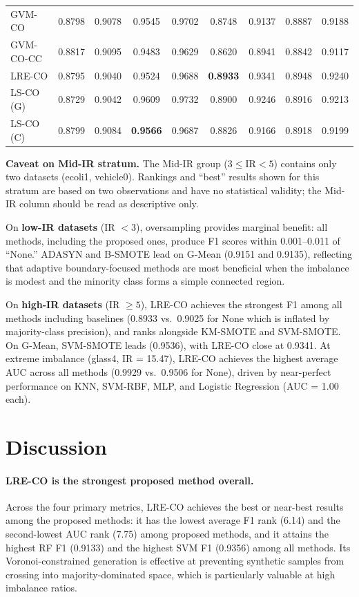 \begin{table}[H]
{\begin{tabular}{lcc|cc|cc|cc}
\midrule
GVM-CO     & 0.8798 & 0.9078 & 0.9545 & 0.9702 & 0.8748 & 0.9137 & 0.8887 & 0.9188 \\
GVM-CO-CC  & 0.8817 & 0.9095 & 0.9483 & 0.9629 & 0.8620 & 0.8941 & 0.8842 & 0.9117 \\
LRE-CO     & 0.8795 & 0.9040 & 0.9524 & 0.9688 & \textbf{0.8933} & 0.9341 & 0.8948 & 0.9240 \\
LS-CO (G)  & 0.8729 & 0.9042 & 0.9609 & 0.9732 & 0.8900 & 0.9246 & 0.8916 & 0.9213 \\
LS-CO (C)  & 0.8799 & 0.9084 & \textbf{0.9566} & 0.9687 & 0.8826 & 0.9166 & 0.8918 & 0.9199 \\
\bottomrule
\end{tabular}
}
\end{table}

\noindent\textbf{Caveat on Mid-IR stratum.}
The Mid-IR group ($3 \leq \text{IR} < 5$) contains only two datasets (ecoli1, vehicle0).
Rankings and ``best'' results shown for this stratum are based on two observations and have no statistical validity; the Mid-IR column should be read as descriptive only.

On \textbf{low-IR datasets} (IR $< 3$), oversampling provides marginal benefit: all methods, including the proposed ones, produce F1 scores within 0.001--0.011 of ``None.''
ADASYN and B-SMOTE lead on G-Mean (0.9151 and 0.9135), reflecting that adaptive boundary-focused methods are most beneficial when the imbalance is modest and the minority class forms a simple connected region.

On \textbf{high-IR datasets} (IR $\geq 5$), LRE-CO achieves the strongest F1 among all methods including baselines (0.8933 vs.\ 0.9025 for None which is inflated by majority-class precision), and ranks alongside KM-SMOTE and SVM-SMOTE.
On G-Mean, SVM-SMOTE leads (0.9536), with LRE-CO close at 0.9341.
At extreme imbalance (glass4, IR = 15.47), LRE-CO achieves the highest average AUC across all methods (0.9929 vs.\ 0.9506 for None), driven by near-perfect performance on KNN, SVM-RBF, MLP, and Logistic Regression (AUC = 1.00 each).




\section{Discussion}
\label{sec:results:discussion}

\paragraph{LRE-CO is the strongest proposed method overall.}
Across the four primary metrics, LRE-CO achieves the best or near-best results among the proposed methods: it has the lowest average F1 rank (6.14) and the second-lowest AUC rank (7.75) among proposed methods, and it attains the highest RF F1 (0.9133) and the highest SVM F1 (0.9356) among all methods.
Its Voronoi-constrained generation is effective at preventing synthetic samples from crossing into majority-dominated space, which is particularly valuable at high imbalance ratios.

